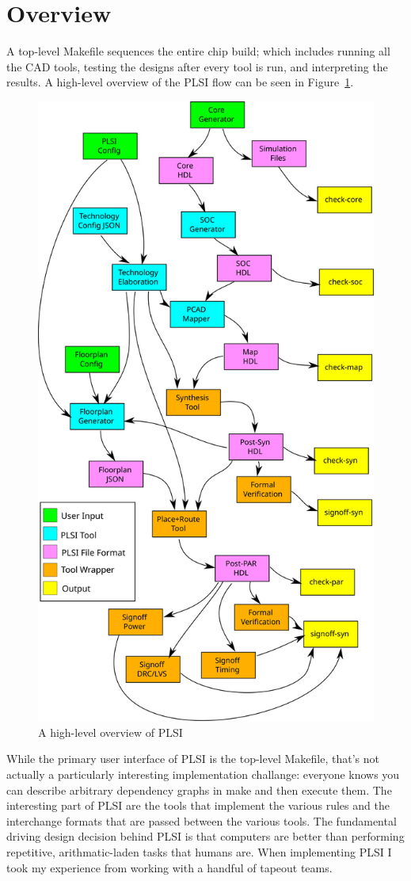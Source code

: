 \documentclass{article}
\begin{document}
\section{Overview}

A top-level Makefile sequences the entire chip build; which includes running
all the CAD tools, testing the designs after every tool is run, and
interpreting the results.  A high-level overview of the PLSI flow can be seen
in Figure~\ref{impl:plsi-flow}.

\begin{figure}
\begin{center}
\includegraphics[width=0.7\linewidth]{figures/plsi-flow.svg}
\end{center}
\caption{A high-level overview of PLSI}
\label{impl:plsi-flow}
\end{figure}

While the primary user interface of PLSI is the top-level Makefile, that's not
actually a particularly interesting implementation challange: everyone knows
you can describe arbitrary dependency graphs in make and then execute them.
The interesting part of PLSI are the tools that implement the various rules and
the interchange formats that are passed between the various tools.  The
fundamental driving design decision behind PLSI is that computers are better
than performing repetitive, arithmatic-laden tasks that humans are.  When
implementing PLSI I took my experience from working with a handful of tapeout
teams.
\end{document}
